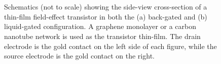 \documentclass[
  a4paper,
]{scrbook}
\begin{document}
\begin{figure}
\begin{minipage}[t]{0.01\linewidth}
\end{minipage}%
%
\begin{minipage}[t]{0.03\linewidth}

{\centering 


}

\end{minipage}%
%
\begin{minipage}[t]{0.01\linewidth}

{\centering 

~

}

\end{minipage}%
%
\begin{minipage}[t]{0.45\linewidth}

{\centering 


}

\end{minipage}%
%
\begin{minipage}[t]{0.01\linewidth}

{\centering 

~

}

\end{minipage}%

\caption{\label{fig-gating-schematics}Schematics (not to scale) showing
the side-view cross-section of a thin-film field-effect transistor in
both the (a) back-gated and (b) liquid-gated configuration. A graphene
monolayer or a carbon nanotube network is used as the transistor
thin-film. The drain electrode is the gold contact on the left side of
each figure, while the source electrode is the gold contact on the
right.}

\end{figure}
\end{document}
